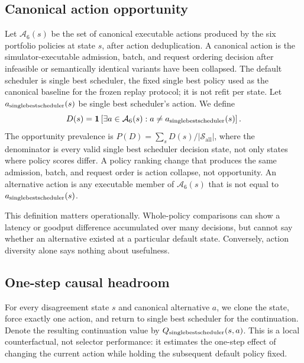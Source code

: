 \documentclass[preprint,12pt]{elsarticle}
\begin{document}
\subsection{Canonical action opportunity}
Let $\mathcal{A}_6(s)$ be the set of canonical executable actions produced by
the six portfolio policies at state $s$, after action deduplication. A
canonical action is the simulator-executable admission, batch, and request
ordering decision after infeasible or semantically identical variants have
been collapsed. The default scheduler is single best scheduler, the fixed single best policy
used as the canonical baseline for the frozen replay protocol; it is not
refit per state. Let $a_{\mathrm{single best scheduler}}(s)$ be single best scheduler's action. We define
\begin{equation}
  D(s) = \mathbf{1}\left[\exists a\in\mathcal{A}_6(s):
  a\ne a_{\mathrm{single best scheduler}}(s)\right].
  \label{eq:disagreement}
\end{equation}
The opportunity prevalence is $P(D)=\sum_sD(s)/|\mathcal{S}_{\mathrm{all}}|$,
where the denominator is every valid single best scheduler decision state, not only states
where policy scores differ. A policy ranking change that produces the same
admission, batch, and request order is action collapse, not opportunity.
An alternative action is any executable member of $\mathcal{A}_6(s)$ that is
not equal to $a_{\mathrm{single best scheduler}}(s)$.

This definition matters operationally. Whole-policy comparisons can show a
latency or goodput difference accumulated over many decisions, but cannot say
whether an alternative existed at a particular default state. Conversely,
action diversity alone says nothing about usefulness.

\subsection{One-step causal headroom}
For every disagreement state $s$ and canonical alternative $a$, we clone the
state, force exactly one action, and return to single best scheduler for the continuation. Denote
the resulting continuation value by $Q_{\mathrm{single best scheduler}}(s,a)$. This is a local
counterfactual, not selector performance: it estimates the one-step effect of
changing the current action while holding the subsequent default policy fixed.
\end{document}
